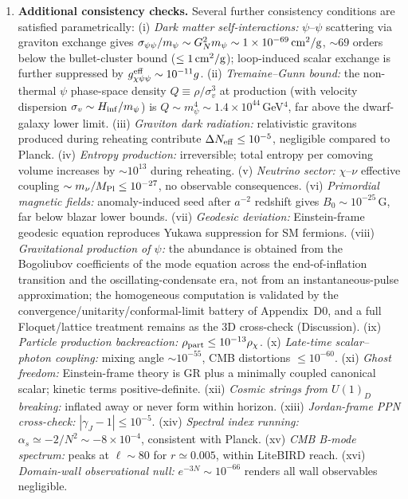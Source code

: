 \documentclass[pdflatex,sn-mathphys-num]{sn-jnl}
\newcommand{\MP}{M_{\rm Pl}}
\theoremstyle{thmstyleone}
\begin{document}
\begin{enumerate}
\item \textbf{Additional consistency checks.} Several further consistency conditions are satisfied parametrically: (i) \emph{Dark matter self-interactions:} $\psi$--$\psi$ scattering via graviton exchange gives $\sigma_{\psi\psi}/m_\psi\sim G_N^2 m_\psi\sim1\times10^{-69}\,{\rm cm}^2/{\rm g}$, $\sim69$ orders below the bullet-cluster bound ($\leq1\,{\rm cm}^2/{\rm g}$); loop-induced scalar exchange is further suppressed by $g_{\chi\psi\psi}^{\rm eff}\sim10^{-11}g$. (ii) \emph{Tremaine--Gunn bound:} the non-thermal $\psi$ phase-space density $Q\equiv\rho/\sigma_v^3$ at production (with velocity dispersion $\sigma_v\sim H_{\rm inf}/m_\psi$) is $Q\sim m_\psi^4\sim1.4\times10^{44}\,$GeV$^4$, far above the dwarf-galaxy lower limit. (iii) \emph{Graviton dark radiation:} relativistic gravitons produced during reheating contribute $\Delta N_{\rm eff}\leq10^{-5}$, negligible compared to Planck. (iv) \emph{Entropy production:} irreversible; total entropy per comoving volume increases by $\sim10^{13}$ during reheating. (v) \emph{Neutrino sector:} $\chi$--$\nu$ effective coupling $\sim m_\nu/\MP\leq10^{-27}$, no observable consequences. (vi) \emph{Primordial magnetic fields:} anomaly-induced seed after $a^{-2}$ redshift gives $B_0\sim10^{-25}\,$G, far below blazar lower bounds. (vii) \emph{Geodesic deviation:} Einstein-frame geodesic equation reproduces Yukawa suppression for SM fermions. (viii) \emph{Gravitational production of $\psi$:} the abundance is obtained from the Bogoliubov coefficients of the mode equation across the end-of-inflation transition and the oscillating-condensate era, not from an instantaneous-pulse approximation; the homogeneous computation is validated by the convergence/unitarity/conformal-limit battery of Appendix~D0, and a full Floquet/lattice treatment remains as the 3D cross-check (Discussion). (ix) \emph{Particle production backreaction:} $\rho_{\rm part}\leq10^{-13}\rho_\chi$. (x) \emph{Late-time scalar--photon coupling:} mixing angle $\sim10^{-55}$, CMB distortions $\leq10^{-60}$. (xi) \emph{Ghost freedom:} Einstein-frame theory is GR plus a minimally coupled canonical scalar; kinetic terms positive-definite. (xii) \emph{Cosmic strings from $U(1)_D$ breaking:} inflated away or never form within horizon. (xiii) \emph{Jordan-frame PPN cross-check:} $|\gamma_J-1|\leq10^{-5}$. (xiv) \emph{Spectral index running:} $\alpha_s\simeq-2/N^2\sim-8\times10^{-4}$, consistent with Planck. (xv) \emph{CMB B-mode spectrum:} peaks at $\ell\sim80$ for $r\simeq0.005$, within LiteBIRD reach. (xvi) \emph{Domain-wall observational null:} $e^{-3N}\sim10^{-66}$ renders all wall observables negligible.
\end{enumerate}
\end{document}
